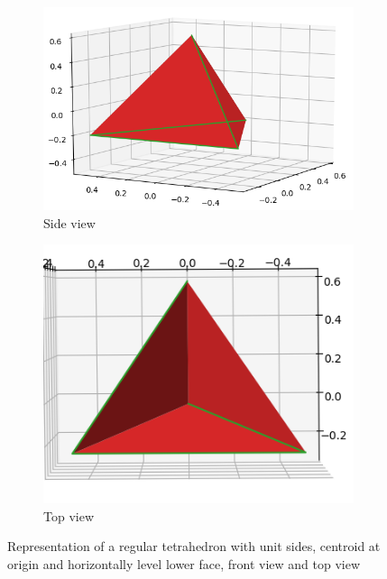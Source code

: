 \begin{figure}[H]
    \centering
    \begin{subfigure}[b]{0.48\textwidth}
    \centering
    \includegraphics[width=1\textwidth]{Figures/unit_tetra.png}
    \caption{Side view}
    \label{fig:d1}
\end{subfigure}
\hfill
\begin{subfigure}[b]{0.48\textwidth}
    \centering
    \includegraphics[width=1\textwidth]{Figures/unit_tetra_top2.png}
    \caption{Top view}
    \label{fig:d2}
\end{subfigure}
    \caption{Representation of a regular tetrahedron with unit sides, centroid at origin and horizontally level lower face, front view and top view}
    \label{fig:regulartetra}
\end{figure}

